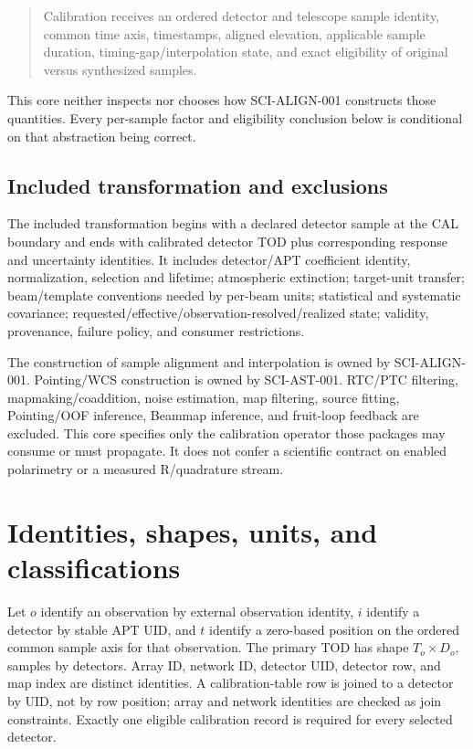 \documentclass[11pt]{article}
\begin{document}
\begin{quote}
Calibration receives an ordered detector and telescope sample identity,
common time axis, timestamps, aligned elevation, applicable sample duration,
timing-gap/interpolation state, and exact eligibility of original versus
synthesized samples.
\end{quote}

This core neither inspects nor chooses how SCI-ALIGN-001 constructs those
quantities.  Every per-sample factor and eligibility conclusion below is
conditional on that abstraction being correct.

\subsection{Included transformation and exclusions}

The included transformation begins with a declared detector sample at the CAL
boundary and ends with calibrated detector TOD plus corresponding response and
uncertainty identities.  It includes detector/APT coefficient identity,
normalization, selection and lifetime; atmospheric extinction; target-unit
transfer; beam/template conventions needed by per-beam units; statistical and
systematic covariance; requested/effective/observation-resolved/realized
state; validity, provenance, failure policy, and consumer restrictions.

The construction of sample alignment and interpolation is owned by
SCI-ALIGN-001.  Pointing/WCS construction is owned by SCI-AST-001.  RTC/PTC
filtering, mapmaking/coaddition, noise estimation, map filtering, source
fitting, Pointing/OOF inference, Beammap inference, and fruit-loop feedback are
excluded.  This core specifies only the calibration operator those packages
may consume or must propagate.  It does not confer a scientific contract on
enabled polarimetry or a measured R/quadrature stream.

\section{Identities, shapes, units, and classifications}

Let \(o\) identify an observation by external observation identity, \(i\)
identify a detector by stable APT UID, and \(t\) identify a zero-based position
on the ordered common sample axis for that observation.  The primary TOD has
shape \(T_o\times D_o\), samples by detectors.  Array ID, network ID, detector
UID, detector row, and map index are distinct identities.  A calibration-table
row is joined to a detector by UID, not by row position; array and network
identities are checked as join constraints.  Exactly one eligible calibration
record is required for every selected detector.
\end{document}
